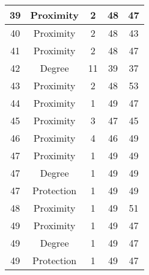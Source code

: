 \documentclass[results.tex]{subfiles}
\begin{document}
\begin{center}
\begin{tabular}{| c || c | c | c | c |}
            \hline
            39                      & Proximity                    & 2                      & 48                      & 47                   \\
            \hline
            40                      & Proximity                    & 2                      & 48                      & 43                   \\
            \hline
            41                      & Proximity                    & 2                      & 48                      & 47                   \\
            \hline
            42                      & Degree                       & 11                     & 39                      & 37                   \\
            \hline
            43                      & Proximity                    & 2                      & 48                      & 53                   \\
            \hline
            44                      & Proximity                    & 1                      & 49                      & 47                   \\
            \hline
            45                      & Proximity                    & 3                      & 47                      & 45                   \\
            \hline
            46                      & Proximity                    & 4                      & 46                      & 49                   \\
            \hline
            47                      & Proximity                    & 1                      & 49                      & 49                   \\
            \hline
            47                      & Degree                       & 1                      & 49                      & 49                   \\
            \hline
            47                      & Protection                   & 1                      & 49                      & 49                   \\
            \hline
            48                      & Proximity                    & 1                      & 49                      & 51                   \\
            \hline
            49                      & Proximity                    & 1                      & 49                      & 47                   \\
            \hline
            49                      & Degree                       & 1                      & 49                      & 47                   \\
            \hline
            49                      & Protection                   & 1                      & 49                      & 47                   \\
            \hline
        \end{tabular}
    \end{center}
\end{document}
